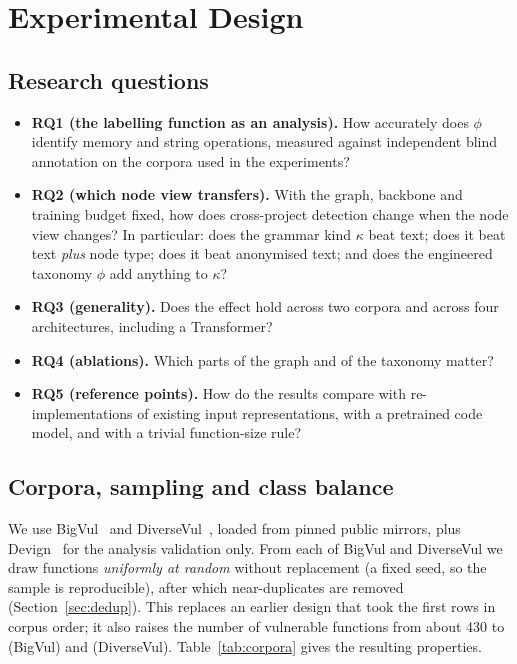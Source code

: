 \section{Experimental Design}
\label{sec:experiment}

\subsection{Research questions}
\begin{itemize}
    \item \textbf{RQ1 (the labelling function as an analysis).} How accurately
          does $\phi$ identify memory and string operations, measured against
          independent blind annotation on the corpora used in the
          experiments?
    \item \textbf{RQ2 (which node view transfers).} With the graph, backbone
          and training budget fixed, how does cross-project detection change
          when the node view changes? In particular: does the grammar kind
          $\kappa$ beat text; does it beat text \emph{plus} node type; does it
          beat anonymised text; and does the engineered taxonomy $\phi$ add
          anything to $\kappa$?
    \item \textbf{RQ3 (generality).} Does the effect hold across two corpora
          and across four architectures, including a Transformer?
    \item \textbf{RQ4 (ablations).} Which parts of the graph and of the
          taxonomy matter?
    \item \textbf{RQ5 (reference points).} How do the results compare with
          re-implementations of existing input representations, with a
          pretrained code model, and with a trivial function-size rule?
\end{itemize}

\subsection{Corpora, sampling and class balance}
\label{sec:corpora}

We use BigVul~\cite{fan2020bigvul} and DiverseVul~\cite{chen2023diversevul},
loaded from pinned public mirrors, plus Devign~\cite{zhou2019devign} for the
analysis validation only. From each of BigVul and DiverseVul we draw
\numcfgN{} functions \emph{uniformly at random} without replacement (a fixed
seed, so the sample is reproducible), after which near-duplicates are removed
(Section~\ref{sec:dedup}). This replaces an earlier design that took the first
rows in corpus order; it also raises the number of vulnerable functions from
about 430 to \numbigvulVuln{} (BigVul) and \numdiversevulVuln{} (DiverseVul).
Table~\ref{tab:corpora} gives the resulting properties.

